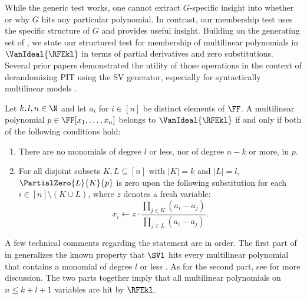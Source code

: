 \documentclass{toc}
\begin{document}
While the generic test works, one cannot extract $G$-specific insight into whether or why $G$ hits any particular polynomial. In contrast, our membership test uses the specific structure of $G$ and provides useful insight. Building on the generating set of ,
we state our structured test for membership of multilinear polynomials in $\VanIdeal{\RFEkl}$ in terms of partial derivatives and zero substitutions. Several prior papers demonstrated the utility of those operations in the context of derandomizing PIT using the SV generator,
especially for syntactically multilinear models
\cite{ShpilkaVolkovich2008,KMSV2009,AvMV2011}.

\begin{theorem}\label{thm.ideal.membership}
  Let $k, l, n \in \N$ and let $a_i$ for $i \in [n]$ be distinct elements of $\FF$.
  A multilinear polynomial $p \in \FF[x_1,\dots,x_n]$ belongs to
  $\VanIdeal{\RFEkl}$ if and only if both of the following conditions hold:
  \begin{enumerate}
    \item\label{thm.ideal.membership.cond1}
      There are no monomials of degree $l$ or less,
      nor of degree $n-k$ or more, in \(p\).
    \item\label{thm.ideal.membership.cond2}
      For all disjoint subsets $K,L \subseteq [n]$ with $|K|=k$ and $|L|=l$,
      $\PartialZero{L}{K}{p}$ is zero upon the following
      substitution for each \(i\in[n]\setminus (K\cup L)\), where $z$ denotes a fresh variable:
      \begin{equation}\label{eq.thm.ideal.membership.sub}
        x_i \gets z\cdot \frac%
          { \prod_{j \in K} (a_i - a_{j}) }%
          { \prod_{j \in L} (a_i - a_{j}) }.
      \end{equation}
  \end{enumerate}
\end{theorem}

A few technical comments regarding the statement are in order.
The first part of  in
 generalizes the known property that $\SVl$ hits
every multilinear polynomial that contains a monomial of degree $l$ or less
\cite{ShpilkaVolkovich2008}. As for the second part, see  for more discussion.  
The two parts together imply that all multilinear polynomials on $n \le k+l+1$ variables are hit by $\RFEkl$.
\end{document}
